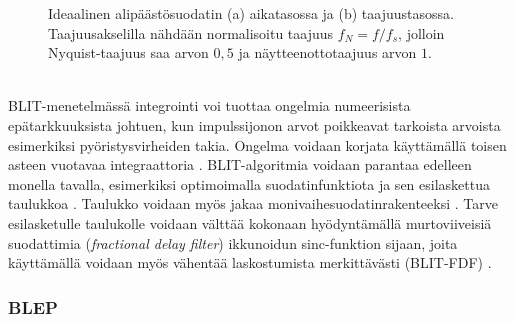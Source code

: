 \documentclass[finnish,12pt,a4paper,pdftex]{article} %
\begin{document}
\begin{figure}[h] 
\begin{center} 
\caption{Ideaalinen alipäästösuodatin (a) aikatasossa ja (b) taajuustasossa. Taajuusakselilla nähdään normalisoitu taajuus $f_N = f/f_s$, jolloin Nyquist-taajuus saa arvon $0,5$ ja näytteenottotaajuus arvon $1$.}
\label{fig:sinc}
\end{center}
\end{figure} \\
BLIT-menetelmässä integrointi voi tuottaa ongelmia numeerisista epätarkkuuksista johtuen, kun impulssijonon arvot poikkeavat tarkoista arvoista esimerkiksi pyöristysvirheiden takia. Ongelma voidaan korjata käyttämällä toisen asteen vuotavaa integraattoria \cite{Stilson1996, Brandt2001}. BLIT-algoritmia voidaan parantaa edelleen monella tavalla, esimerkiksi optimoimalla suodatinfunktiota ja sen esilaskettua taulukkoa \cite{Pekonen2014, Valimaki2012}. Taulukko voidaan myös jakaa monivaihesuodatinrakenteeksi \cite{Valimaki2007}. Tarve esilasketulle taulukolle voidaan välttää kokonaan hyödyntämällä murtoviiveisiä suodattimia (\textit{fractional delay filter}) ikkunoidun sinc-funktion sijaan, joita käyttämällä voidaan myös vähentää laskostumista merkittävästi (BLIT-FDF) \cite{Nam2010}.

\subsubsection{BLEP}
\end{document}
